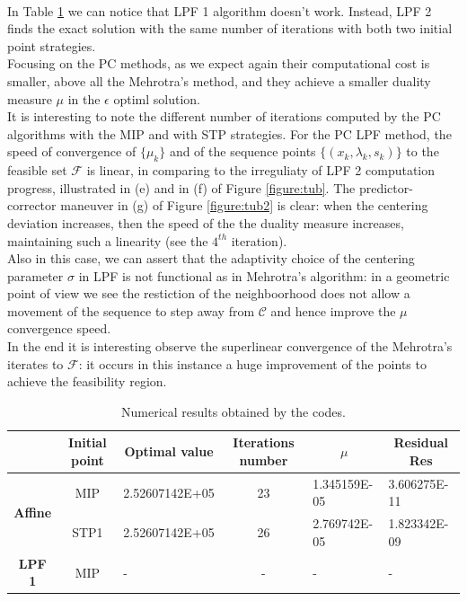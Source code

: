 \documentclass[a4paper,10 pt,titlepage,twoside]{book}
\theoremstyle{plain}
\theoremstyle{definition}
\theoremstyle{remark}
\begin{document}
{{\\In Table \ref{table:TP} we can notice that LPF 1 algorithm doesn't work. Instead, LPF 2 finds the exact solution with the same number of iterations with both two initial point strategies. \\
Focusing on the PC methods, as we expect again their computational cost is smaller, above all the Mehrotra's method, and they achieve a smaller duality measure $\mu$ in the $\epsilon$ optiml solution.\\ It is interesting to note the different number of iterations computed by the PC algorithms with the MIP and with STP strategies. For the PC LPF method, the speed of convergence of $\{\mu_{k}\}$ and of the sequence points $\{(x_{k},\lambda_{k},s_{k})\}$ to the feasible set $\mathcal{F}$ is linear, in comparing to the irreguliaty of LPF 2 computation progress, illustrated in (e) and in (f) of Figure \ref{figure:tub}.
The predictor-corrector maneuver in (g) of Figure \ref{figure:tub2} is clear: when the centering deviation increases, then the speed of the the duality measure increases, maintaining such a linearity (see the $4^{th}$ iteration).\\
Also in this case, we can assert that the adaptivity choice of the centering parameter $\sigma$ in LPF is not functional as in Mehrotra's algorithm: in a geometric point of view we see the restiction of the neighboorhood does not allow a movement of the sequence to step away from $\mathcal{C}$ and hence improve the $\mu$ convergence speed.\\
In the end it is interesting observe the superlinear convergence of the Mehrotra's iterates to $\mathcal{F}$: it occurs in this instance a huge improvement of the points to achieve the feasibility region.
\begin{table}[]\caption{\label{table:TP}Numerical results obtained by the codes.}
	\begin{tabular}{cclcll}
		\hline		\textbf{} & \textbf{Initial point} & \multicolumn{1}{c}{\textbf{Optimal value}} & \textbf{Iterations number} & \multicolumn{1}{c}{\textbf{$\mu$}} & \multicolumn{1}{c}{\textbf{Residual} Res} \\ \hline
		\multicolumn{1}{c|}{\multirow{2}{*}{\textbf{Affine}}} & MIP & 2.52607142E+05 & 23 & 1.345159E-05 & 3.606275E-11 \\
		\multicolumn{1}{c|}{} & STP1 & 2.52607142E+05 & 26 & 2.769742E-05 & 1.823342E-09 \\ \hline
		\multicolumn{1}{c|}{\multirow{2}{*}{\textbf{LPF 1}}} & MIP & - & - & - & - \\

\end{tabular}
\end{table}}}
\end{document}
